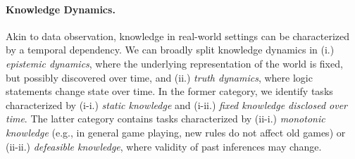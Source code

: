 %
%


\paragraph{Knowledge Dynamics.} Akin to data observation, knowledge in real-world settings can be characterized by a temporal dependency.
We can broadly split knowledge dynamics in (i.) \textit{epistemic dynamics}, where the underlying representation of the world is fixed, but possibly discovered over time, and (ii.) \textit{truth dynamics}, where logic statements change state over time.
%
In the former category, we identify tasks characterized by (i-i.) \textit{static knowledge} and (i-ii.) \textit{fixed knowledge disclosed over time}. %
The latter category contains tasks characterized by (ii-i.) \textit{monotonic knowledge} (e.g., in general game playing, new rules do not affect old games) or  (ii-ii.) \textit{defeasible knowledge}, where validity of past inferences may change.

